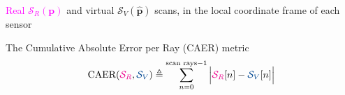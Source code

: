 \begin{minipage}[c]{\textwidth}
\begin{minipage}[t]{0.33\textwidth}
{\textcolor{magenta}{Real $\mathcal{S}_R(\bm{p})$} and
\textcolor[RGB]{0,71,145}{virtual $\mathcal{S}_V(\hat{\bm{p}})$}
scans, in the local coordinate frame of each sensor
\endminipage}
\end{minipage}
\hfill
  \begin{minipage}[t]{0.66\textwidth}
{\Large\vspace{-2em}
\begin{definition}\centering
  \hspace{-10px} The Cumulative Absolute Error per Ray (CAER) metric
\begin{align}
  \text{CAER}(\textcolor{magenta}{\mathcal{S}_R},\textcolor[RGB]{0,71,145}{\mathcal{S}_V}) \triangleq \sum\limits_{n=0}^{\text{scan rays}-1} \Big| \textcolor{magenta}{\mathcal{S}_R}[n]-\textcolor[RGB]{0,71,145}{\mathcal{S}_V}[n]\Big| \label{eq:caer}
\end{align}
\end{definition}
}
\vspace{1em}
\begin{minipage}[t]{0.33\textwidth}
\end{minipage}
\hfill
\begin{minipage}{0.33\textwidth}
\end{minipage}

\end{minipage}

\end{minipage} %
\newpage
